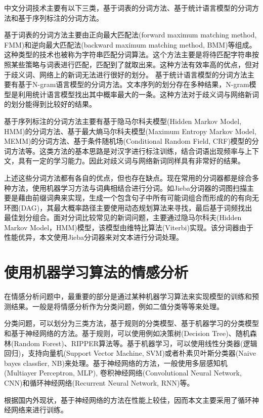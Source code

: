 \documentclass[a4paper,AutoFakeBold,oneside,12pt]{book}
\begin{document}
中文分词技术主要有以下三类，基于词表的分词方法、基于统计语言模型的分词方法和基于序列标注的分词方法。

基于词表的分词方法主要由正向最大匹配法(forward maximum matching method, FMM)和逆向最大匹配法(backward maximum matching method, BMM)等组成。这种类型的技术也被称为字符串匹配分词算法。这个方法主要是将待匹配字符串按照某些策略与词表进行匹配，匹配到了就取出来。这种方法有效率高的优点，但对于歧义词、网络上的新词无法进行很好的划分。
基于统计语言模型的分词方法主要有基于N-gram语言模型的分词方法。文本序列的划分存在多种结果，N-gram模型是利用统计语言模型找出其中概率最大的一条。这种方法对于歧义词与网络新词的划分能得到比较好的结果。

基于序列标注的分词方法主要有基于隐马尔科夫模型(Hidden Markov Model, HMM)的分词方法、基于最大熵马尔科夫模型(Maximum Entropy Markov Model, MEMM)的分词方法、基于条件随机场(Conditional Random Field, CRF)模型的分词方法等。这类方法的基本思路是对汉字进行标注训练，结合词语出现频率与上下文，具有一定的学习能力。因此对歧义词与网络新词同样具有非常好的结果。

上述这些分词方法都有各自的优点，但也存在缺点。现在常用的分词器都是综合多种方法，使用机器学习方法与词典相结合进行分词。如Jieba分词器的词图扫描主要是藉由前缀词典来实现，生成一个包含句子中所有可能词组合而形成的的有向无环图(DAG)，其最大概率路径主要使用动态规划算法来寻找，最后基于词频找出最佳划分组合。面对分词比较常见的新词问题，主要通过隐马尔科夫(Hidden Markov Model，HMM)模型，该模型由维特比算法(Viterbi)实现。该分词器由于性能优异，本文使用Jieba分词器来对文本进行分词处理。

\section{使用机器学习算法的情感分析}

在情感分析问题中，最重要的部分是通过某种机器学习算法来实现模型的训练和预测结果。一般是将情感分析作为分类问题，例如二值分类等等来处理。

分类问题，可以划分为三类方法，基于规则的分类模型、基于机器学习的分类模型和基于神经网络的方法。基于规则，可以使用例如决策树(Decision Tree)、随机森林(Random Forest)、RIPPER算法等。基于机器学习，可以使用线性分类器(逻辑回归)，支持向量机(Support Vector Machine, SVM)或者朴素贝叶斯分类器(Naive bayes classfier, NB)来处理。基于神经网络的方法，一般使用多层感知机(Multiayer Perceptron, MLP), 卷积神经网络(Convolutional Neural Network, CNN)和循环神经网络(Recurrent Neural Network, RNN)等。

根据国内外现状，基于神经网络的方法在性能上较佳，因而本文主要采用了循环神经网络来进行训练。
\end{document}
